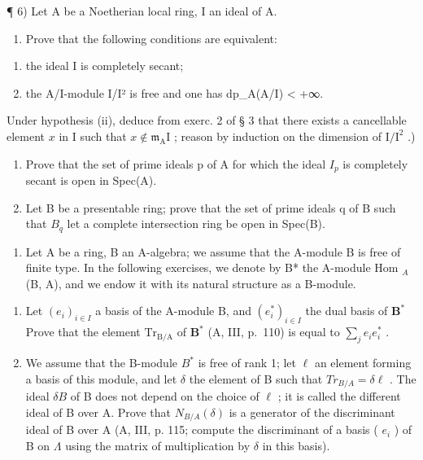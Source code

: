 ¶ 6) Let A be a Noetherian local ring, I an ideal of A.

\begin{enumerate}
\def\labelenumi{\alph{enumi})}
\tightlist
\item
  Prove that the following conditions are equivalent:
\end{enumerate}

\begin{enumerate}
\def\labelenumi{(\roman{enumi})}
\item
  the ideal I is completely secant;
\item
  the A/I-module I/I² is free and one has dp\_A(A/I) \textless{} +∞.
\end{enumerate}

Under hypothesis (ii), deduce from exerc. 2 of § 3 that there exists a cancellable element \(x\) in I such that \(x \notin \mathfrak{m}_{\mathrm{A}}\mathrm{I}\) ; reason by induction on the dimension of \(\mathrm{I} / \mathrm{I}^2\) .)

\begin{enumerate}
\def\labelenumi{\alph{enumi})}
\setcounter{enumi}{1}
\item
  Prove that the set of prime ideals p of A for which the ideal \(I_{p}\) is completely secant is open in Spec(A).
\item
  Let B be a presentable ring; prove that the set of prime ideals q of B such that \(B_{q}\) let a complete intersection ring be open in Spec(B).
\end{enumerate}

\begin{enumerate}
\def\labelenumi{\arabic{enumi})}
\setcounter{enumi}{6}
\tightlist
\item
  Let A be a ring, B an A-algebra; we assume that the A-module B is free of finite type. In the following exercises, we denote by B* the A-module Hom \(_{A}\) (B, A), and we endow it with its natural structure as a B-module.
\end{enumerate}

\begin{enumerate}
\def\labelenumi{\alph{enumi})}
\item
  Let \((e_i)_{i\in I}\) a basis of the A-module B, and \((e_i^*)_{i\in I}\) the dual basis of \(\mathbf{B}^*\) Prove that the element \(\mathrm{Tr}_{\mathrm{B / A}}\) of \(\mathbf{B}^*\) (A, III, p.~110) is equal to \(\sum_{j}e_{i}e_{i}^{*}\) .
\item
  We assume that the B-module \(B^{*}\) is free of rank 1; let \(\ell\) an element forming a basis of this module, and let \(\delta\) the element of B such that \(Tr_{B/A} = \delta\ell\) . The ideal \(\delta B\) of B does not depend on the choice of \(\ell\) ; it is called the different ideal of B over A. Prove that \(N_{B/A}(\delta)\) is a generator of the discriminant ideal of B over A (A, III, p. 115; compute the discriminant of a basis ( \(e_{i}\) ) of B on \(\Lambda\) using the matrix of multiplication by \(\delta\) in this basis).
\end{enumerate}

